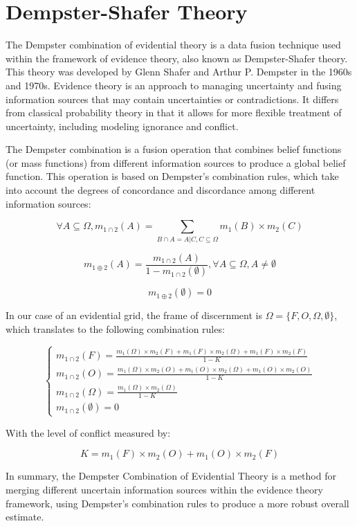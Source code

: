 \section{Dempster-Shafer Theory} \label{sec:dempster_shafer_theory}

The Dempster combination of evidential theory is a data fusion technique used within the framework of evidence theory, also known as Dempster-Shafer theory.
This theory was developed by Glenn Shafer and Arthur P. Dempster in the 1960s and 1970s.
Evidence theory is an approach to managing uncertainty and fusing information sources that may contain uncertainties or contradictions.
It differs from classical probability theory in that it allows for more flexible treatment of uncertainty, including modeling ignorance and conflict.

The Dempster combination is a fusion operation that combines belief functions (or mass functions) from different information sources to produce a global belief function.
This operation is based on Dempster's combination rules, which take into account the degrees of concordance and discordance among different information sources:

$$
    \forall A \subseteq \Omega, m_{1\cap2}(A) = \sum_{B\cap A = A | C, C \subseteq \Omega} m_{1}(B) \times m_{2}(C)
$$

$$
    m_{1\oplus2}(A) = \frac{m_{1\cap2}(A)}{1-m_{1\cap2}(\emptyset)}, \forall A\subseteq \Omega, A \neq \emptyset
$$

$$
    m_{1 \oplus 2}(\emptyset) = 0
$$

In our case of an evidential grid, the frame of discernment is $\Omega = \{F, O, \Omega, \emptyset\}$, which translates to the following combination rules:

$$
    \begin{cases}
        m_{1\cap2}(F) = \frac{m_{1}(\Omega) \times m_{2}(F) + m_{1}(F) \times m_{2}(\Omega) + m_{1}(F) \times m_{2}(F)}{1 - K} \\
        m_{1\cap2}(O) = \frac{m_{1}(\Omega) \times m_{2}(O) + m_{1}(O) \times m_{2}(\Omega) + m_{1}(O) \times m_{2}(O)}{1 - K} \\
        m_{1\cap2}(\Omega) = \frac{m_{1}(\Omega) \times m_{2}(\Omega)}{1 - K}                                                  \\
        m_{1\cap2}(\emptyset) = 0
    \end{cases}
$$

With the level of conflict measured by:

$$
    K = m_{1}(F) \times m_{2}(O) + m_{1}(O) \times m_{2}(F)
$$

In summary, the Dempster Combination of Evidential Theory is a method for merging different uncertain information sources within the evidence theory framework, using Dempster's combination rules to produce a more robust overall estimate.

